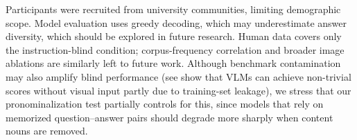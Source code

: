 \documentclass[letterpaper]{article}
\begin{document}
Participants were recruited from university communities, limiting demographic scope.
Model evaluation uses greedy decoding, which may underestimate answer diversity, which should be explored in future research. 
Human data covers only the instruction-blind condition; corpus-frequency correlation
\citep{mccoy2024embers} and broader image ablations are similarly left to future work.
Although benchmark contamination may also amplify blind performance (see \citet{chen2024are} show that VLMs can achieve non-trivial scores without visual input partly due to training-set leakage), we stress that our pronominalization test partially controls for this, since models that rely on memorized question--answer pairs should degrade more sharply when content nouns are removed.
\end{document}
